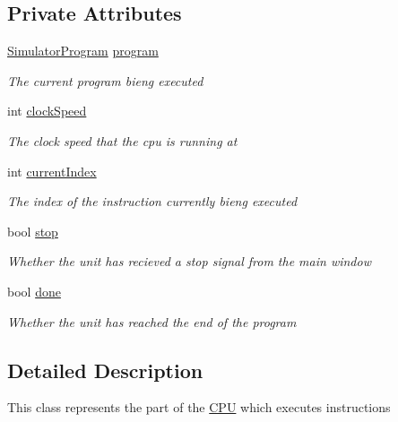 \subsection*{Private Attributes}
\begin{DoxyCompactItemize}
\item 
\hyperlink{class_c_p_u___o_s___simulator_1_1_c_p_u_1_1_simulator_program}{Simulator\+Program} \hyperlink{class_c_p_u___o_s___simulator_1_1_c_p_u_1_1_execution_unit_a192670bee8ca089c38e9989350f658d6}{program}
\begin{DoxyCompactList}\small\item\em The current program bieng executed \end{DoxyCompactList}\item 
int \hyperlink{class_c_p_u___o_s___simulator_1_1_c_p_u_1_1_execution_unit_a0deb0a3e0c9fa402598bbf18be6535cc}{clock\+Speed}
\begin{DoxyCompactList}\small\item\em The clock speed that the cpu is running at \end{DoxyCompactList}\item 
int \hyperlink{class_c_p_u___o_s___simulator_1_1_c_p_u_1_1_execution_unit_af6807cb5343acc2c40a08166c748f1f0}{current\+Index}
\begin{DoxyCompactList}\small\item\em The index of the instruction currently bieng executed \end{DoxyCompactList}\item 
bool \hyperlink{class_c_p_u___o_s___simulator_1_1_c_p_u_1_1_execution_unit_aad508435c1085ec880b75723260b0439}{stop}
\begin{DoxyCompactList}\small\item\em Whether the unit has recieved a stop signal from the main window \end{DoxyCompactList}\item 
bool \hyperlink{class_c_p_u___o_s___simulator_1_1_c_p_u_1_1_execution_unit_aa62cb66691fd4d782a4fa5c70843da6e}{done}
\begin{DoxyCompactList}\small\item\em Whether the unit has reached the end of the program \end{DoxyCompactList}\end{DoxyCompactItemize}


\subsection{Detailed Description}
This class represents the part of the \hyperlink{namespace_c_p_u___o_s___simulator_1_1_c_p_u}{C\+P\+U} which executes instructions 



